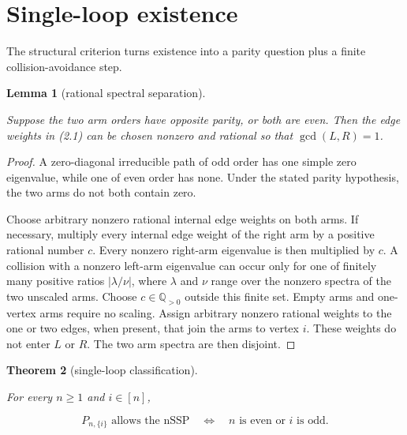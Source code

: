 \documentclass[11pt]{article}
\newtheorem{theorem}{Theorem}[section]
\newtheorem{lemma}[theorem]{Lemma}
\theoremstyle{remark}
\begin{document}
\section{Single-loop existence}


The structural criterion turns existence into a parity question plus a finite collision-avoidance step.

\begin{lemma}[rational spectral separation]
\label{lemma:5-1}

Suppose the two arm orders have opposite parity, or both are even. Then the edge weights in (2.1) can be
chosen nonzero and rational so that $\gcd(L,R)=1$.

\end{lemma}

\begin{proof}

A zero-diagonal irreducible path of odd order has one simple zero eigenvalue, while one of even order has
none. Under the stated parity hypothesis, the two arms do not both contain zero.

Choose arbitrary nonzero rational internal edge weights on both arms. If necessary, multiply every
internal edge weight of the right arm by a positive rational number $c$. Every nonzero right-arm
eigenvalue is then multiplied by $c$. A collision with a nonzero left-arm eigenvalue can occur only for
one of finitely many positive ratios $|\lambda/\nu|$, where $\lambda$ and $\nu$ range over the
nonzero spectra of the two unscaled arms. Choose $c\in\mathbb Q_{>0}$ outside this finite set. Empty
arms and one-vertex arms require no scaling. Assign arbitrary nonzero rational weights to the one or two
edges, when present, that join the arms to vertex $i$. These weights do not enter $L$ or $R$. The
two arm spectra are then disjoint. \qedhere

\end{proof}

\begin{theorem}[single-loop classification]
\label{theorem:5-2}

For every $n\geq1$ and $i\in[n]$,

\[
  P_{n,\{i\}}\text{ allows the nSSP}
  \quad\Longleftrightarrow\quad
  n\text{ is even or }i\text{ is odd}.                   \tag{5.1}
\]

\end{theorem}
\end{document}

